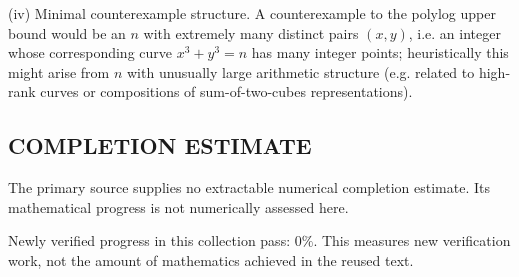 (iv) Minimal counterexample structure.
A counterexample to the polylog upper bound would be an $n$ with extremely many distinct pairs $(x,y)$, i.e. an integer whose corresponding curve $x^3+y^3=n$ has many integer points; heuristically this might arise from $n$ with unusually large arithmetic structure (e.g. related to high-rank curves or compositions of sum-of-two-cubes representations).



\subsection*{COMPLETION ESTIMATE}
The primary source supplies no extractable numerical completion estimate. Its mathematical progress is not numerically assessed here.

Newly verified progress in this collection pass: $0\%$. This measures new verification work, not the amount of mathematics achieved in the reused text.
